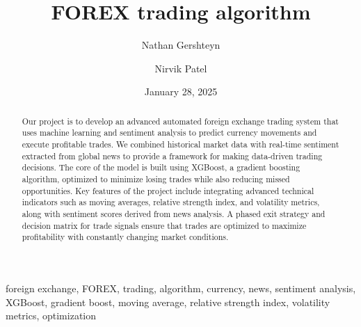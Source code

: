 ﻿\documentclass[12pt,conference,onecolumn]{IEEEtran}
\title{FOREX trading algorithm}
\author{Nathan Gershteyn \and Nirvik Patel}
\date{January 28, 2025}
\newcommand{\keywords}{foreign exchange, FOREX, trading, algorithm, currency, news, sentiment analysis, XGBoost, gradient boost, moving average, relative strength index, volatility metrics, optimization}
\begin{document}
\maketitle 

\begin{abstract}
Our project is to develop an advanced automated foreign exchange trading system that uses machine learning and sentiment analysis to predict currency movements and execute profitable trades. We combined historical market data with real-time sentiment extracted from global news to provide a framework for making data-driven trading decisions. The core of the model is built using XGBoost, a gradient boosting algorithm, optimized to minimize losing trades while also reducing missed opportunities. Key features of the project include integrating advanced technical indicators such as moving averages, relative strength index, and volatility metrics, along with sentiment scores derived from news analysis. A phased exit strategy and decision matrix for trade signals ensure that trades are optimized to maximize profitability with constantly changing market conditions.
\end{abstract}

\begin{IEEEkeywords}
\keywords
\end{IEEEkeywords}
\end{document}
